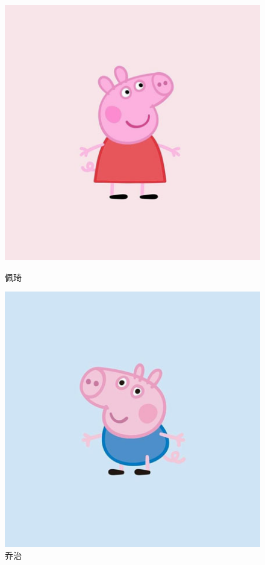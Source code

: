 \begin{figure}[htbp]
  \begin{minipage}{0.5\linewidth}
    \centering
    \includegraphics[width=0.9\linewidth]{img/peppa.jpg}
    \caption{佩琦}
    \label{fig:double:left}
  \end{minipage}
  \begin{minipage}{0.5\linewidth}
    \centering
    \includegraphics[width=0.9\linewidth]{img/george.jpg}
    \caption{乔治}
    \label{fig:double:right}
  \end{minipage}
\end{figure}
